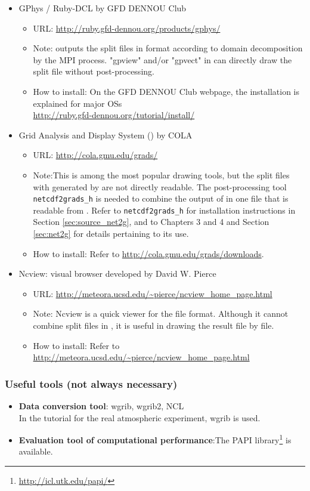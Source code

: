 \begin{itemize}
\item GPhys / Ruby-DCL by GFD DENNOU Club
 \begin{itemize}
  \item URL: \url{http://ruby.gfd-dennou.org/products/gphys/}
  \item Note: \scalelib outputs the split files
  in {\netcdf} format according to domain decomposition by the MPI process.
  "gpview" and/or "gpvect" in {\gphys} can directly draw the split file without post-processing.
  \item How to install:
  On the GFD DENNOU Club webpage, the installation is explained for major OSs\\
  \url{http://ruby.gfd-dennou.org/tutorial/install/}\\
   \end{itemize}
\item Grid Analysis and Display System (\grads) by COLA
 \begin{itemize}
  \item URL: \url{http://cola.gmu.edu/grads/}
  \item Note:This is among the most popular drawing tools,
  but the split files with {\netcdf} generated by \scalelib are not directly readable.
  The post-processing tool \verb|netcdf2grads_h| is needed to combine the output of \scalelib in one file that is readable from \grads. Refer to \verb|netcdf2grads_h| for installation instructions in Section \ref{sec:source_net2g}, and to Chapters 3 and 4 and Section \ref{sec:net2g} for details pertaining to its use.
  \item How to install: Refer to \url{http://cola.gmu.edu/grads/downloads}.
 \end{itemize}
\item Ncview: {\netcdf} visual browser developed by David W. Pierce
 \begin{itemize}
  \item URL: \url{http://meteora.ucsd.edu/~pierce/ncview_home_page.html}
  \item Note: Ncview is a quick viewer for the {\netcdf} file format.
  Although it cannot combine split files in \scalelib, it is useful in drawing the result file by file.
  \item How to install: Refer to \url{http://meteora.ucsd.edu/~pierce/ncview_home_page.html}
 \end{itemize}
\end{itemize}


\subsubsection{Useful tools (not always necessary)}
\begin{itemize}
  \item {\bf Data conversion tool}: wgrib, wgrib2, NCL\\
  In the tutorial for the real atmospheric experiment, wgrib is used.
  \item {\bf Evaluation tool of computational performance}:The PAPI library\footnote{\url{http://icl.utk.edu/papi/}} is available.
\end{itemize}

